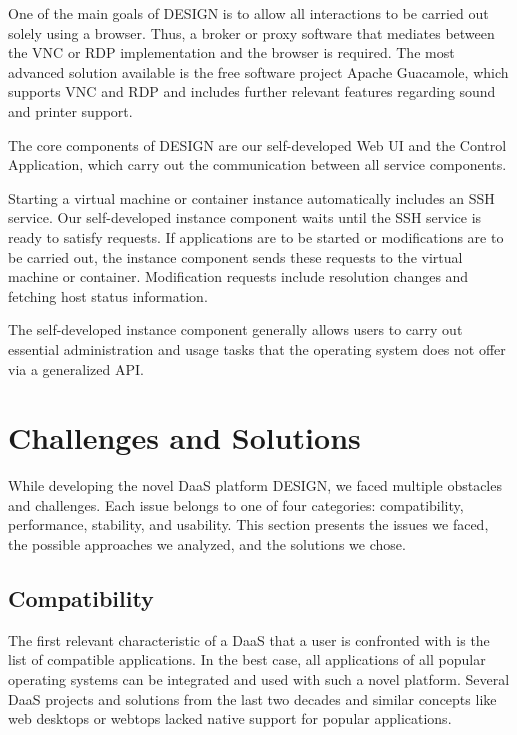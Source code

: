 \documentclass[runningheads]{llncs}
\begin{document}
One of the main goals of DESIGN is to allow all interactions to be carried out
solely using a browser.
Thus, a broker or proxy software that mediates between the VNC or RDP
implementation and the browser is required.
The most advanced solution available
is the free software project Apache Guacamole, which supports VNC and RDP
and includes further relevant features regarding sound and printer support.

The core components of DESIGN are our self-developed Web UI
and the Control Application,
which carry out the communication between all service components.

Starting a virtual machine or container instance automatically includes an SSH service.
Our self-developed instance component waits
until the SSH service is ready to satisfy requests.
If applications are to be started or modifications are to be carried out,
the instance component sends these requests to the virtual machine or container.
Modification requests include resolution changes
and fetching host status information.

The self-developed instance component generally allows users
to carry out essential administration
and usage tasks that the operating system does not offer via a generalized API.

\section{Challenges and Solutions}\label{sec:AnalysisPossibleComponents}

While developing the novel DaaS platform DESIGN,
we faced multiple obstacles and challenges.
Each issue belongs to one of four categories:
compatibility, performance, stability, and usability.
This section presents the issues we faced,
the possible approaches we analyzed, and the solutions we chose.

\subsection{Compatibility}

The first relevant characteristic of a DaaS
that a user is confronted with
is the list of compatible applications.
In the best case,
all applications of all popular operating systems
can be integrated and used with such a novel platform.
Several DaaS projects and solutions from the last two decades
and similar concepts like web desktops
or webtops lacked native support for popular applications.
\end{document}
